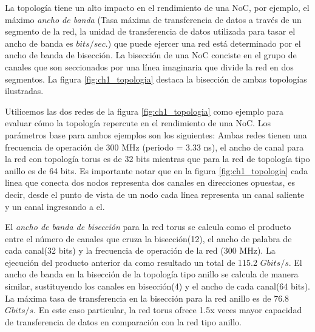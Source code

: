 La topología tiene un alto impacto en el rendimiento de una NoC, por ejemplo, el máximo \textit{ancho de banda} (Tasa máxima de transferencia de datos a través de un segmento de la red, la unidad de transferencia de datos utilizada para tasar el ancho de banda es $bits/sec$.) que puede ejercer una red está determinado por el ancho de banda de bisección. La bisección de una NoC conciste en el grupo de canales que son seccionados por una línea imaginaria que divide la red en dos segmentos. La figura \ref{fig:ch1_topologia} destaca la bisección de ambas topologías ilustradas.

Utilicemos las dos redes de la figura \ref{fig:ch1_topologia} como ejemplo para evaluar cómo la topología repercute en el rendimiento de una NoC. Los parámetros base para ambos ejemplos son los siguientes: Ambas redes tienen una frecuencia de operación de 300 MHz (periodo = 3.33 ns), el ancho de canal para la red con topología torus es de 32 bits mientras que para la red de topología tipo anillo es de 64 bits. Es importante notar que en la figura \ref{fig:ch1_topologia} cada linea que conecta dos nodos representa dos canales en direcciones opuestas, es decir, desde el punto de vista de un nodo cada línea representa un canal saliente y un canal ingresando a el.

El \textit{ancho de banda de bisección} para la red torus se calcula como el producto entre el número de canales que cruza la bisección(12), el ancho de palabra de cada canal(32 bits) y la frecuencia de operación de la red (300 MHz). La ejecución del producto anterior da como resultado un total de 115.2 $Gbits/s$. El ancho de banda en la bisección de la topología tipo anillo se calcula de manera similar, sustituyendo los canales en bisección(4) y el ancho de cada canal(64 bits). La máxima tasa de transferencia en la bisección para la red anillo es de 76.8 $Gbits/s$. En este caso particular, la red torus ofrece 1.5x veces mayor capacidad de transferencia de datos en comparación con la red tipo anillo.

